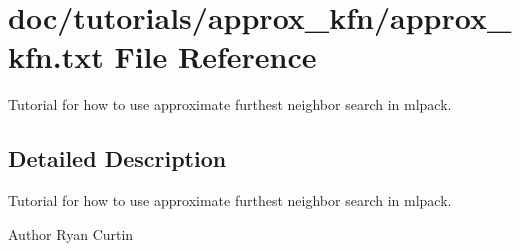 \section{doc/tutorials/approx\+\_\+kfn/approx\+\_\+kfn.txt File Reference}
\label{approx__kfn_8txt}


Tutorial for how to use approximate furthest neighbor search in mlpack.  




\subsection{Detailed Description}
Tutorial for how to use approximate furthest neighbor search in mlpack. 

\begin{DoxyAuthor}{Author}
Ryan Curtin 
\end{DoxyAuthor}
